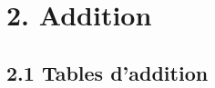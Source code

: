 \documentclass{exam}
\begin{document}
\section*{\textcolor{blue!80!black}{2. Addition}}

\subsection*{\textcolor{blue!60!black}{2.1 Tables d'addition}}

\newcommand{\cg}[1]{\cellcolor{facile}#1}
\newcommand{\cy}[1]{\cellcolor{moyen}#1}
\newcommand{\crd}[1]{\cellcolor{difficile}#1}

\end{document}
